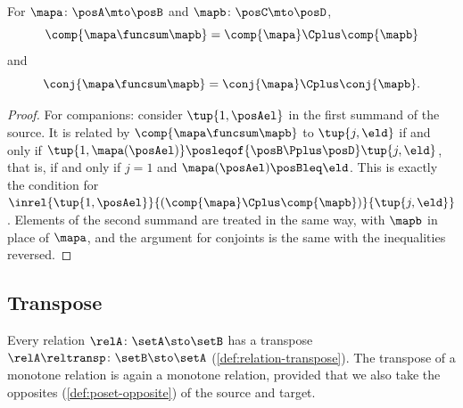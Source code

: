 \begin{lemma}
    \label{lem:companion-sum}
    For  $\mapa \colon \posA \mto \posB$ and $\mapb \colon \posC \mto \posD$,
    \begin{equation}
        \comp{\mapa \funcsum \mapb} = \comp{\mapa} \Cplus \comp{\mapb}
     \end{equation}
     and
     \begin{equation}
        \conj{\mapa \funcsum \mapb} = \conj{\mapa} \Cplus \conj{\mapb}.
    \end{equation}
\end{lemma}
\begin{proof}
    For companions: consider $\tup{1, \posAel}$ in the first summand of the source.
    It is related by $\comp{\mapa \funcsum \mapb}$ to $\tup{j, \eld}$ if and only if $\tup{1, \mapa(\posAel)} \posleqof{\posB \Pplus \posD} \tup{j, \eld}$, that is, if and only if $j = 1$ and $\mapa(\posAel) \posBleq \eld$.
    This is exactly the condition for $\inrel{\tup{1, \posAel}}{(\comp{\mapa} \Cplus \comp{\mapb})}{\tup{j, \eld}}$.
    Elements of the second summand are treated in the same way, with $\mapb$ in place of $\mapa$, and the argument for conjoints is the same with the inequalities reversed.
\end{proof}

\subsection{Transpose}

Every relation $\relA \colon \setA \sto \setB$ has a transpose $\relA\reltransp \colon \setB \sto \setA$ (\cref{def:relation-transpose}).
The transpose of a monotone relation is again a monotone relation, provided that we also take the opposites (\cref{def:poset-opposite}) of the source and target.

